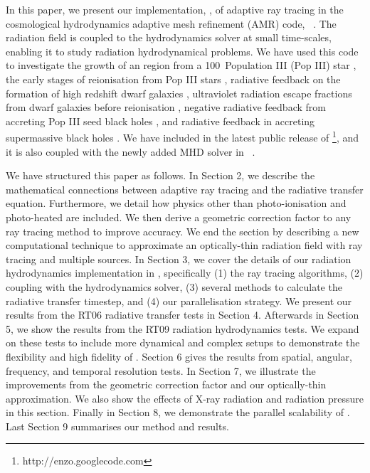 \documentclass[useAMS,usenatbib]{mn2e}
\begin{document}
In this paper, we present our implementation, \moray, of adaptive ray
tracing \citep{Abel02_RT} in the cosmological hydrodynamics adaptive
mesh refinement (AMR) code, \enzo~\citep{BryanNorman1997, OShea2004}.
The radiation field is coupled to the hydrodynamics solver at small
time-scales, enabling it to study radiation hydrodynamical problems.
We have used this code to investigate the growth of an \hii region
from a 100\Ms~Population III (Pop III) star \citep{Abel07}, the early
stages of reionisation from Pop III stars \citep{Wise08_Reion},
radiative feedback on the formation of high redshift dwarf galaxies
\citep{Wise08_Gal, Wise10_Gal}, ultraviolet radiation escape fractions
from dwarf galaxies before reionisation \citep{Wise09}, negative
radiative feedback from accreting Pop III seed black holes
\citep{Alvarez09}, and radiative feedback in accreting supermassive
black holes \citep[][in prep.]{Kim11}.  We have included \moray in the
latest public release of \enzo\footnote{http://enzo.googlecode.com},
and it is also coupled with the newly added MHD solver in
\enzo~\citep{Wang09}.

We have structured this paper as follows.  In Section 2, we describe
the mathematical connections between adaptive ray tracing and the
radiative transfer equation.  Furthermore, we detail how physics other
than photo-ionisation and photo-heated are included.  We then derive a
geometric correction factor to any ray tracing method to improve
accuracy.  We end the section by describing a new computational
technique to approximate an optically-thin radiation field with ray
tracing and multiple sources.  In Section 3, we cover the details of
our radiation hydrodynamics implementation in \enzo, specifically (1)
the ray tracing algorithms, (2) coupling with the hydrodynamics
solver, (3) several methods to calculate the radiative transfer
timestep, and (4) our parallelisation strategy.  We present our
results from the RT06 radiative transfer tests in Section 4.
Afterwards in Section 5, we show the results from the RT09 radiation
hydrodynamics tests.  We expand on these tests to include more
dynamical and complex setups to demonstrate the flexibility and high
fidelity of \moray.  Section 6 gives the results from spatial,
angular, frequency, and temporal resolution tests.  In Section 7, we
illustrate the improvements from the geometric correction factor and
our optically-thin approximation.  We also show the effects of X-ray
radiation and radiation pressure in this section.  Finally in Section
8, we demonstrate the parallel scalability of \moray.  Last Section 9
summarises our method and results.
\end{document}

